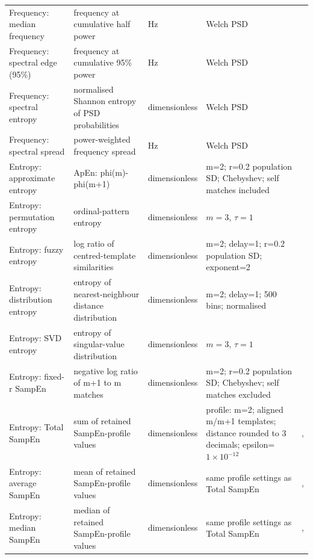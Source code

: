 \documentclass[10pt]{article}
\begin{document}
\begin{landscape}
\begin{longtable}{p{3.4cm}p{6.2cm}p{2.0cm}p{4.7cm}p{3.2cm}}
Frequency: median frequency & frequency at cumulative half power & Hz & Welch PSD & \citep{Welch1967PSD} \\
Frequency: spectral edge (95\%) & frequency at cumulative 95\% power & Hz & Welch PSD & \citep{Welch1967PSD} \\
Frequency: spectral entropy & normalised Shannon entropy of PSD probabilities & dimensionless & Welch PSD & \citep{Inouye1991EEGSpectralEntropy} \\
Frequency: spectral spread & power-weighted frequency spread & Hz & Welch PSD & \citep{Welch1967PSD} \\
Entropy: approximate entropy & ApEn: phi(m)-phi(m+1) & dimensionless & m=2; r=0.2 population SD; Chebyshev; self matches included & \citep{Pincus1991ApproximateEntropy} \\
Entropy: permutation entropy & ordinal-pattern entropy & dimensionless & $m=3$, $\tau=1$ & \citep{Bandt2002PermutationEntropy} \\
Entropy: fuzzy entropy & log ratio of centred-template similarities & dimensionless & m=2; delay=1; r=0.2 population SD; exponent=2 & \citep{Chen2007FuzzyEntropy} \\
Entropy: distribution entropy & entropy of nearest-neighbour distance distribution & dimensionless & m=2; delay=1; 500 bins; normalised & \citep{Li2015DistributionEntropy} \\
Entropy: SVD entropy & entropy of singular-value distribution & dimensionless & $m=3$, $\tau=1$ & \citep{Roberts1999SVDEntropy} \\
Entropy: fixed-r SampEn & negative log ratio of m+1 to m matches & dimensionless & m=2; r=0.2 population SD; Chebyshev; self matches excluded & \citep{Richman2000SampleEntropy} \\
Entropy: Total SampEn & sum of retained SampEn-profile values & dimensionless & profile: m=2; aligned m/m+1 templates; distance rounded to 3 decimals; epsilon=$1\times10^{-12}$ & \citep{Udhayakumar2018SampEnProfile},\citep{udhayakumar2020entropycodes} \\
Entropy: average SampEn & mean of retained SampEn-profile values & dimensionless & same profile settings as Total SampEn & \citep{Udhayakumar2018SampEnProfile},\citep{udhayakumar2020entropycodes} \\
Entropy: median SampEn & median of retained SampEn-profile values & dimensionless & same profile settings as Total SampEn & \citep{Udhayakumar2018SampEnProfile},\citep{udhayakumar2020entropycodes} \\

\end{longtable}
\end{landscape}
\end{document}

